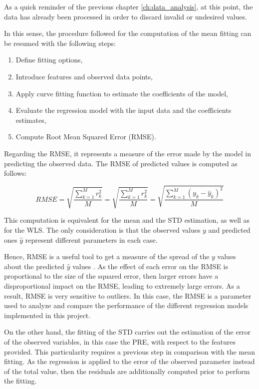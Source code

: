 \documentclass[a4paper, report, oneside, UKenglish]{memoir}
\begin{document}
As a quick reminder of the previous chapter \ref{ch:data_analysis}, at this point, the data has already been processed in order to discard invalid or undesired values. 

In this sense, the procedure followed for the computation of the mean fitting can be resumed with the following steps:
\begin{enumerate}
    \item Define fitting options,
    \item Introduce features and observed data points,  
    \item Apply curve fitting function to estimate the coefficients of the model,
    \item Evaluate the regression model with the input data and the coefficients estimates,
    \item Compute Root Mean Squared Error (RMSE). 
\end{enumerate}

Regarding the RMSE, it represents a measure of the error made by the model in predicting the observed data. The RMSE of predicted values is computed as follows:

\begin{equation}
    RMSE = \sqrt{\frac{\sum\limits_{k=1}^{M}{r}_{k}^{2}}{M}} = \sqrt{\frac{\sum\limits_{k=1}^{M}{r}_{k}^{2}}{M}} = \sqrt{\frac{\sum\limits_{k=1}^{M}(y_k - \hat{y}_k)^2}{M}} 
\end{equation}

This computation is equivalent for the mean and the STD estimation, as well as for the WLS. The only consideration is that the observed values $y$ and predicted ones $\hat{y}$ represent different parameters in each case.  
 
Hence, RMSE is a useful tool to get a measure of the spread of the $y$ values about the predicted $\hat{y}$ values \cite{StanfordRMSE}. As the effect of each error on the RMSE is proportional to the size of the squared error, then larger errors have a disproportional impact on the RMSE, leading to extremely large errors. As a result, RMSE is very sensitive to outliers. In this case, the RMSE is a parameter used to analyze and compare the performance of the different regression models implemented in this project.   

On the other hand, the fitting of the STD carries out the estimation of the error of the observed variables, in this case the PRE, with respect to the features provided. This particularity requires a previous step in comparison with the mean fitting. As the regression is applied to the error of the observed parameter instead of the total value, then the residuals are additionally computed prior to perform the fitting.  
\end{document}
